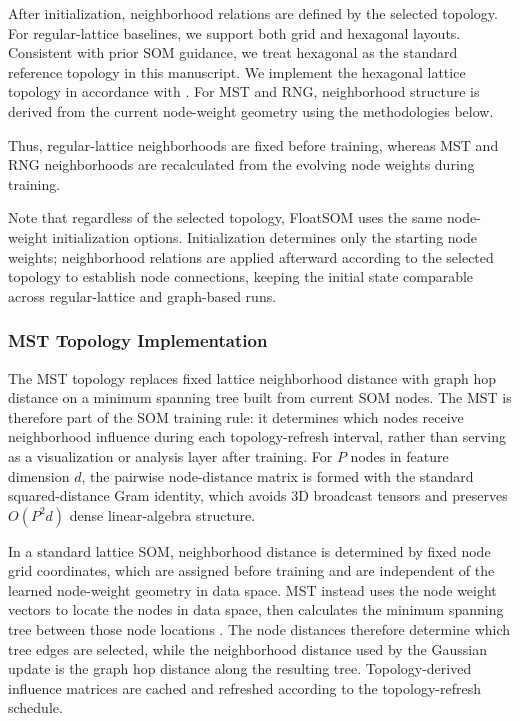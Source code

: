 \documentclass[10pt]{article} %
\begin{document}
After initialization, neighborhood relations are defined by the selected topology. For regular-lattice baselines, we support both grid and hexagonal layouts. Consistent with prior SOM guidance, we treat hexagonal as the standard reference topology in this manuscript. We implement the hexagonal lattice topology in accordance with \citep{vettigliJustGlowingMinisom2018}. For MST and RNG, neighborhood structure is derived from the current node-weight geometry using the methodologies below.

Thus, regular-lattice neighborhoods are fixed before training, whereas MST and RNG neighborhoods are recalculated from the evolving node weights during training.

Note that regardless of the selected topology, FloatSOM uses the same node-weight initialization options. Initialization determines only the starting node weights; neighborhood relations are applied afterward according to the selected topology to establish node connections, keeping the initial state comparable across regular-lattice and graph-based runs.

\subsubsection{MST Topology Implementation}

The MST topology replaces fixed lattice neighborhood distance with graph hop distance on a minimum spanning tree built from current SOM nodes. The MST is therefore part of the SOM training rule: it determines which nodes receive neighborhood influence during each topology-refresh interval, rather than serving as a visualization or analysis layer after training. For $P$ nodes in feature dimension $d$, the pairwise node-distance matrix is formed with the standard squared-distance Gram identity, which avoids 3D broadcast tensors and preserves $O(P^2 d)$ dense linear-algebra structure.

In a standard lattice SOM, neighborhood distance is determined by fixed node grid coordinates, which are assigned before training and are independent of the learned node-weight geometry in data space. MST instead uses the node weight vectors to locate the nodes in data space, then calculates the minimum spanning tree between those node locations \citep{kruskalShortestSpanningSubtree1956}. The node distances therefore determine which tree edges are selected, while the neighborhood distance used by the Gaussian update is the graph hop distance along the resulting tree. Topology-derived influence matrices are cached and refreshed according to the topology-refresh schedule.
\end{document}
